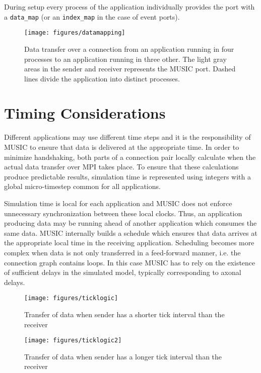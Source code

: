 \documentclass[a4paper]{report}
\begin{document}
During setup every process of the application individually provides
the port with a \lstinline|data_map| (or an \lstinline|index_map| in
the case of event ports).

\begin{figure}
  \begin{center}
    \texttt{[image: figures/datamapping]}
    \caption[Mapping of data]{\label{fig:datamapping}
      Data transfer over a connection from an application running in
      four processes to an application running in three other.  The
      light gray areas in the sender and receiver represents the MUSIC
      port.  Dashed lines divide the application into distinct
      processes.
    }
  \end{center}
\end{figure}

\section{Timing Considerations}
\label{sec:timing}
  
Different applications may use different time steps and it is the
responsibility of MUSIC to ensure that data is delivered at the
appropriate time.  In order to minimize handshaking, both parts of a
connection pair locally calculate when the actual data transfer over
MPI takes place.  To ensure that these calculations produce
predictable results, simulation time is represented using integers
with a global micro-timestep common for all
applications.

Simulation time is local for each application
and MUSIC does not enforce unnecessary synchronization between these
local clocks.  Thus, an application producing data may be running
ahead of another application which consumes the same data.  MUSIC
internally builds a schedule which ensures that data arrives at the
appropriate local time in the receiving application.  Scheduling
becomes more complex when data is not only transferred in a
feed-forward manner, i.e. the connection graph contains loops.  In
this case MUSIC has to rely on the existence of sufficient delays in
the simulated model, typically corresponding to axonal
delays.

\begin{figure}
  \begin{center}
    \begin{minipage}{0.45\textwidth}
      \texttt{[image: figures/ticklogic]}
      \caption[Timing of data transfer, slowdown]{\label{fig:timingshorter}
        Transfer of data when sender has a shorter
        tick interval than the receiver}
    \end{minipage}
    \hfill
    \begin{minipage}{0.45\textwidth}
      \texttt{[image: figures/ticklogic2]}
      \caption[Timing of data transfer, speedup]{\label{fig:timinglonger}
        Transfer of data when sender has a longer
        tick interval than the receiver}
    \end{minipage}
  \end{center}
\end{figure}
\end{document}
